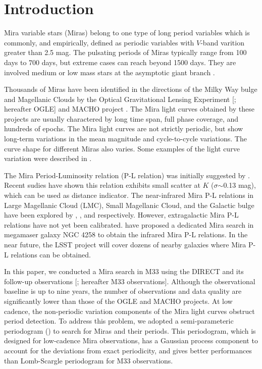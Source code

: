 \section{Introduction}

Mira variable stars (Miras) belong to one type of long period variables which is commonly, and empirically, defined as periodic variables with $V$-band varition greater than 2.5 mag. The pulsating periods of Miras typically range from 100 days to 700 days, but extreme cases can reach beyond 1500 days. They are involved medium or low mass stars at the asymptotic giant branch \citep{2009asrp.proc...48F}. 

Thousands of Miras have been identified in the directions of the Milky Way bulge and Magellanic Clouds by the Optical Gravitational Lensing Experiment [\cite{1992AcA....42..253U}; hereafter OGLE] and MACHO project \citep{1993ASPC...43..291A}. The Mira light curves obtained by these projects are usually charactered by long time span, full phase coverage, and hundreds of epochs. The Mira light curves are not strictly periodic, but show long-term variations in the mean magnitude and cycle-to-cycle variations. The curve shape for different Miras also varies. Some examples of the light curve variation were described in \cite{2012OEJV..149....1H}.

The Mira Period-Luminosity relation (P-L relation) was initially suggested by \cite{1928PNAS...14..963G}. Recent sudies \citep{2003MNRAS.343...67G} have shown this relation exhibits small scatter at $K$ ($\sigma$$\sim$0.13 mag), which can be used as distance indicator. The near-infrared Mira P-L relations in Large Magellanic Cloud (LMC), Small Magellanic Cloud, and the Galactic bulge have been explored by \cite{2009AcA....59..239S}, \cite{2011AcA....61..217S}, and \cite{2013AcA....63...21S} respectively. However, extragalactic Mira P-L relations have not yet been calibrated. \cite{2013hst..prop13445B} have proposed a dedicated Mira search in megamaser galaxy NGC 4258 to obtain the infrared Mira P-L relations. In the near future, the LSST project will cover dozens of nearby galaxies where Mira P-L relations can be obtained\citep{2009arXiv0912.0201L}.

In this paper, we conducted a Mira search in M33 using the DIRECT and its follow-up observations [\cite{1998AJ....115.1016K,2011ApJS..193...26P}; hereafter M33 observations]. Although the observational baseline is up to nine years, the number of observations and data quality are significantly lower than those of the OGLE and MACHO projects. At low cadence, the non-periodic variation components of the Mira light curves obstruct period detection. To address this problem, we adopted a semi-parameteric periodogram () to search for Miras and their periods. This periodogram, which is designed for low-cadence Mira observations, has a Gaussian process component to account for the deviations from exact periodicity, and gives better performances than Lomb-Scargle \citep{1976Ap&SS..39..447L,1982ApJ...263..835S} periodogram for M33 observations.


